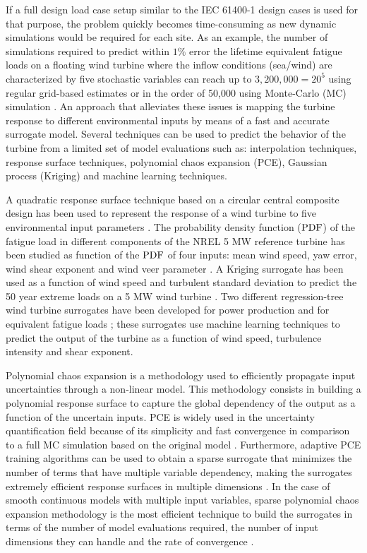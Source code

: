 \documentclass[preprint,12pt]{elsarticle}
\begin{document}
If a full design load case setup similar to the IEC 61400-1 design cases is used for that purpose, the problem quickly becomes time-consuming as new dynamic simulations would be required for each site. As an example, the number of simulations required to predict within $1\%$ error the lifetime equivalent fatigue loads on a floating wind turbine where the inflow conditions (sea/wind) are characterized by five stochastic variables can reach up to $3,200,000=20^5$ using regular grid-based estimates or in the order of 50,000 using Monte-Carlo (MC) simulation \cite{graf2015high}. An approach that alleviates these issues is mapping the turbine response to different environmental inputs by means of a fast and accurate surrogate model. Several techniques can be used to predict the behavior of the turbine from a limited set of model evaluations such as: interpolation techniques, response surface techniques, polynomial chaos expansion (PCE), Gaussian process (Kriging) and machine learning techniques. 

A quadratic response surface technique based on a circular central composite design has been used to represent the response of a wind turbine to five environmental input parameters \cite{toft2016assessment}. The probability density function ($\mathrm{PDF}$) of the fatigue load in different components of the NREL 5 MW reference turbine has been studied as function of the $\mathrm{PDF}$ of four inputs: mean wind speed, yaw error, wind shear exponent and wind veer parameter \cite{TallwindReport}. A Kriging surrogate has been used as a function of wind speed and turbulent standard deviation to predict the 50 year extreme loads on a 5 MW wind turbine \cite{abdallah2016influence}. Two different regression-tree wind turbine surrogates have been developed for power production \cite{clifton2013using} and for equivalent fatigue loads \cite{clifton2014effect}; these surrogates use machine learning techniques to predict the output of the turbine as a function of wind speed, turbulence intensity and shear exponent.

Polynomial chaos expansion is a methodology used to efficiently propagate input uncertainties through a non-linear model. This methodology consists in building a polynomial response surface to capture the global dependency of the output as a function of the uncertain inputs. PCE is widely used in the uncertainty quantification field because of its simplicity and fast convergence in comparison to a full MC simulation based on the original model \cite{soize2004physical, le2004uncertainty, choi2004polynomial, berveiller2006stochastic, xiu2005high}. Furthermore, adaptive PCE training algorithms can be used to obtain a sparse surrogate that minimizes the number of terms that have multiple variable dependency, making the surrogates extremely efficient response surfaces in multiple dimensions  \cite{blatman2011adaptive,pedregosa2011scikit,tibshirani1996regression}. In the case of smooth continuous models with multiple input variables, sparse polynomial chaos expansion methodology is the most efficient technique to build the surrogates in terms of the number of model evaluations required, the number of input dimensions they can handle and the rate of convergence \cite{blatman2011adaptive}.
\end{document}
